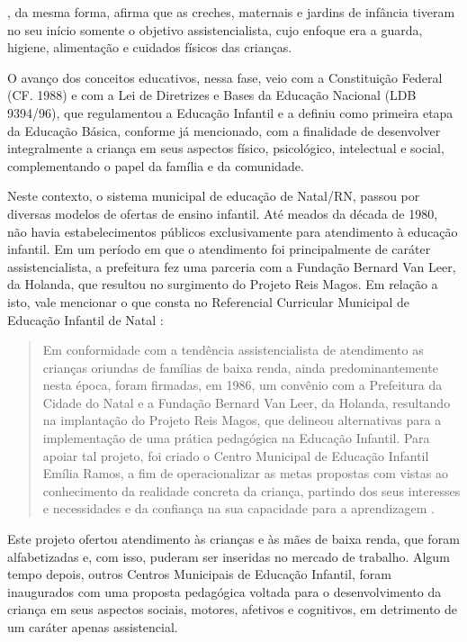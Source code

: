 \begin{refsection}
    \textcite{DIDONET2001Creche}, da mesma forma, afirma que as creches, maternais e jardins de infância tiveram no seu início somente o objetivo assistencialista, cujo enfoque era a guarda, higiene, alimentação e cuidados físicos das crianças. 

    O avanço dos conceitos educativos, nessa fase, veio com a Constituição Federal (CF. 1988) e com a Lei de Diretrizes e Bases da Educação Nacional (LDB 9394/96), que regulamentou a Educação Infantil e a definiu como primeira etapa da Educação Básica, conforme já mencionado, com a finalidade de desenvolver integralmente a criança em seus aspectos físico, psicológico, intelectual e social, complementando o papel da família e da comunidade. 

    Neste contexto, o sistema municipal de educação de Natal/RN, passou por diversas modelos de ofertas de ensino infantil. Até meados da década de 1980, não havia estabelecimentos públicos exclusivamente para atendimento à educação infantil. Em um período em que o atendimento foi principalmente de caráter assistencialista, a prefeitura fez uma parceria com a Fundação Bernard Van Leer, da Holanda, que resultou no surgimento do Projeto Reis Magos. Em relação a isto, vale mencionar o que consta no Referencial Curricular Municipal de Educação Infantil de Natal \cite{SOUZAAndMORAES2008Referenciais}: 

    \begin{quotation}
        Em conformidade com a tendência assistencialista de atendimento as crianças oriundas de famílias de baixa renda, ainda predominantemente nesta época, foram firmadas, em 1986, um convênio com a Prefeitura da Cidade do Natal e a Fundação Bernard Van Leer, da Holanda, resultando na implantação do Projeto Reis Magos, que delineou alternativas para a implementação de uma prática pedagógica na Educação Infantil. Para apoiar tal projeto, foi criado o Centro Municipal de Educação Infantil Emília Ramos, a fim de operacionalizar as metas propostas com vistas ao conhecimento da realidade concreta da criança, partindo dos seus interesses e necessidades e da confiança na sua capacidade para a aprendizagem \cite[p.~14--15]{SOUZAAndMORAES2008Referenciais}.
    \end{quotation}

    Este projeto ofertou atendimento às crianças e às mães de baixa renda, que foram alfabetizadas e, com isso, puderam ser inseridas no mercado de trabalho. Algum tempo depois, outros Centros Municipais de Educação Infantil, foram inaugurados com uma proposta pedagógica voltada para o desenvolvimento da criança em seus aspectos sociais, motores, afetivos e cognitivos, em detrimento de um caráter apenas assistencial. 


\end{refsection}
